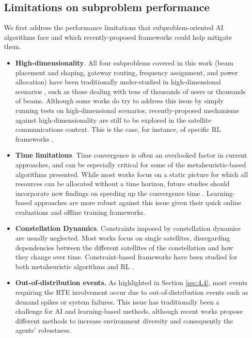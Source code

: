 \documentclass[letterpaper]{article} %
\begin{document}
\subsection{Limitations on subproblem performance}
We first address the performance limitations that subproblem-oriented AI algorithms face and which recently-proposed frameworks could help mitigate them.
\begin{itemize}
    \item \textbf{High-dimensionality}. All four subproblems covered in this work (beam placement and shaping, gateway routing, frequency assignment, and power allocation) have been traditionally under-studied in high-dimensional scenarios \cite{Luis2020}, such as those dealing with tens of thousands of users or thousands of beams. Although some works do try to address this issue \cite{hu2020dynamic, Luis2019} by simply running tests on high-dimensional scenarios, recently-proposed mechanisms against high-dimensionality are still to be explored in the satellite communications context. This is the case, for instance, of specific RL frameworks \cite{van2020q, zahavy2018learn}.
    
    \item \textbf{Time limitations}. Time convergence is often an overlooked factor in current approaches, and can be especially critical for some of the metaheuristic-based algorithms presented. While most works focus on a static picture for which all resources can be allocated without a time horizon, future studies should incorporate new findings on speeding up the convergence time \cite{nia2009speeding}. Learning-based approaches are more robust against this issue given their quick online evaluations and offline training frameworks.
    
    \item \textbf{Constellation Dynamics}. Constraints imposed by constellation dynamics are usually neglected. Most works focus on single satellites, disregarding dependencies between the different satellites of the constellation and how they change over time. Constraint-based frameworks have been studied for both metaheuristic algorithms \cite{homaifar1994constrained} and RL \cite{garcia2015comprehensive, dalal2018safe, Bohez2019}.
    
    \item \textbf{Out-of-distribution events.} As highlighted in Section \ref{sec:4.4}, most events requiring the RTE involvement occur due to out-of-distribution events such as demand spikes or system failures. This issue has traditionally been a challenge for AI and learning-based methods, although recent works propose different methods to increase environment diversity \cite{Ghosh2017, Lee2019, Tobin2017} and consequently the agents' robustness.
\end{itemize}
\end{document}
